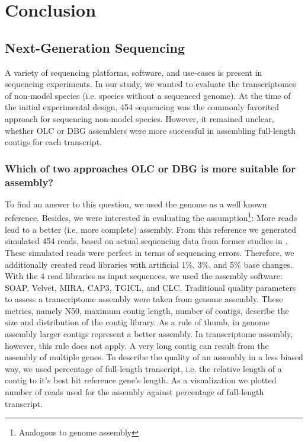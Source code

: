\chapter{Conclusion}
 \section{Next-Generation Sequencing} %
	A variety of sequencing platforms, software, and use-cases is present in sequencing experiments.
	In our study, we wanted to evaluate the transcriptomes of non-model species (i.e. species without a sequenced genome).
	At the time of the initial experimental design, 454 sequencing was the commonly favorited approach for sequencing non-model species.
	However, it remained unclear, whether \ac{OLC} or \ac{DBG} assemblers were more successful in assembling full-length contigs for each transcript.
	\subsection{Which of two approaches \ac{OLC} or \ac{DBG} is more suitable for  assembly?}
	To find an answer to this question, we used the  genome as a well known reference.
	Besides, we were interested in evaluating the assumption\footnote{Analogous to genome assembly}: More reads lead to a better (i.e. more complete) assembly.
	From this reference we generated simulated 454 reads, based on actual sequencing data from former studies in  \cite{op_Braeutigam2010}.
	These simulated reads were perfect in terms of sequencing errors.
	Therefore, we additionally created read libraries with artificial 1\%, 3\%, and 5\% base changes.
	With the 4 read libraries as input sequences, we used the assembly software:     \ac{SOAP}\cite{unknown}, \ac{Velvet}\cite{unknown}, \ac{MIRA}\cite{unknown}, \ac{CAP3}\cite{unknown}, \ac{TGICL}\cite{unknown}, and \ac{CLC}\cite{CLC}.
	Traditional quality parameters to assess a  transcriptome assembly were taken from genome assembly.
	These metrics, namely N50, maximum contig length, number of contigs, describe the size and distribution of the contig library.
	As a rule of thumb, in genome assembly larger contigs represent a better assembly.
	In transcriptome assembly, however, this rule does not apply.
	A very long contig can result from the assembly of multiple genes.
	To describe the quality of an assembly in a less biased way, we used percentage of full-length transcript, i.e. the relative length of a contig to it's best hit reference gene's length.
	As a visualization we plotted number of reads used for the assembly against percentage of full-length transcript.
	
